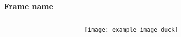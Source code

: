 \documentclass{beamer}
\begin{document}
\begin{frame}
  \frametitle{Frame name}
  \begin{columns}[T]
    \begin{column}{.5\textwidth}
      \centering
    \end{column}
    \begin{column}{.5\textwidth}
      \centering
      \texttt{[image: example-image-duck]}
    \end{column}
  \end{columns}
\end{frame}
\end{document}
